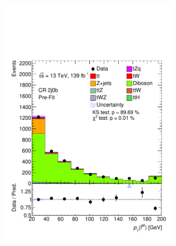 \begin{figure}[h!]
\begin{subfigure}[b]{0.33\linewidth}
    \includegraphics[width=\linewidth]{ubonn-thesis/Chapters/Chapters_05/Figure/CR_VV/CR_2j0b_lepW_pt.pdf} 
  \end{subfigure}%
  \begin{subfigure}[b]{0.33\linewidth}
    \centering

\end{subfigure}
\end{figure}
